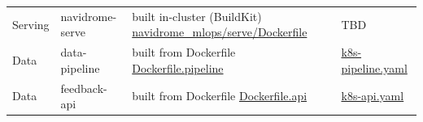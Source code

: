 \documentclass[11pt,a4paper]{article}
\begin{document}
\begin{longtable}{@{} p{1.5cm} p{2.6cm} p{4.8cm} p{4.4cm} @{}}
Serving &
navidrome-serve &
built in-cluster (BuildKit) \newline
\href{https://github.com/yeshavyas27/navidrome_mlops/blob/master/serve/Dockerfile}{navidrome\_mlops/serve/Dockerfile} &
TBD \\[8pt]

Data &
data-pipeline &
built from Dockerfile \newline
\href{https://github.com/hashirmuzaffar/navidrome-mlops-data-proj05/blob/main/docker/Dockerfile.pipeline}{Dockerfile.pipeline} &
\href{https://github.com/hashirmuzaffar/navidrome-mlops-data-proj05/blob/main/docker/k8s-pipeline.yaml}{k8s-pipeline.yaml} \\[8pt]

Data &
feedback-api &
built from Dockerfile \newline
\href{https://github.com/hashirmuzaffar/navidrome-mlops-data-proj05/blob/main/docker/Dockerfile.api}{Dockerfile.api} &
\href{https://github.com/hashirmuzaffar/navidrome-mlops-data-proj05/blob/main/docker/k8s-api.yaml}{k8s-api.yaml} \\

\end{longtable}
\end{document}
